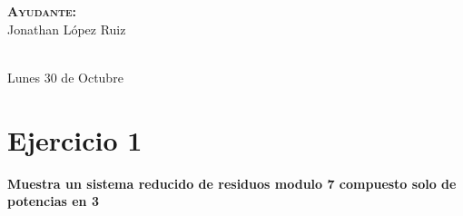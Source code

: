 \documentclass[12pt, fleqn]{article}                             %
\begin{document}
\begin{titlepage}
\begin{minipage}{0.4\textwidth}
\begin{flushright}
            \vspace{2em}

            \textbf{\textsc{Ayudante: }}\\
            Jonathan López Ruiz
        \end{flushright}
    




\end{minipage}\\[3,5cm]
    
    
    {\large Lunes 30 de Octubre}\\[2cm] 

    \vfill

\end{titlepage}




\section{Ejercicio 1}

    \textbf{Muestra un sistema reducido de residuos modulo 7 compuesto solo de potencias en 3}
\end{document}
